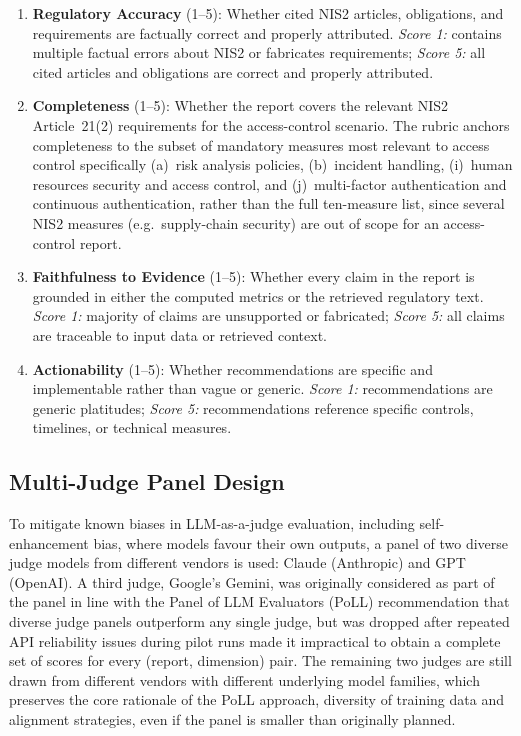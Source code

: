 \documentclass[]{UCD_CS_FYP_Report}
\begin{document}
\begin{enumerate}
    \item \textbf{Regulatory Accuracy} (1--5): Whether cited NIS2 articles, obligations, and requirements are factually correct and properly attributed. \textit{Score 1:} contains multiple factual errors about NIS2 or fabricates requirements; \textit{Score 5:} all cited articles and obligations are correct and properly attributed.
    \item \textbf{Completeness} (1--5): Whether the report covers the relevant NIS2 Article~21(2) requirements for the access-control scenario. The rubric anchors completeness to the subset of mandatory measures most relevant to access control specifically (a)~risk analysis policies, (b)~incident handling, (i)~human resources security and access control, and (j)~multi-factor authentication and continuous authentication, rather than the full ten-measure list, since several NIS2 measures (e.g.\ supply-chain security) are out of scope for an access-control report.
    \item \textbf{Faithfulness to Evidence} (1--5): Whether every claim in the report is grounded in either the computed metrics or the retrieved regulatory text. \textit{Score 1:} majority of claims are unsupported or fabricated; \textit{Score 5:} all claims are traceable to input data or retrieved context.
    \item \textbf{Actionability} (1--5): Whether recommendations are specific and implementable rather than vague or generic. \textit{Score 1:} recommendations are generic platitudes; \textit{Score 5:} recommendations reference specific controls, timelines, or technical measures.
\end{enumerate}
 
\subsection{Multi-Judge Panel Design}
 
To mitigate known biases in LLM-as-a-judge evaluation, including self-enhancement bias, where models favour their own outputs\cite{ZhengMTBench2023}, a panel of two diverse judge models from different vendors is used: Claude (Anthropic) and GPT (OpenAI). A third judge, Google's Gemini, was originally considered as part of the panel in line with the Panel of LLM Evaluators (PoLL) recommendation\cite{Verga2024PoLL} that diverse judge panels outperform any single judge, but was dropped after repeated API reliability issues during pilot runs made it impractical to obtain a complete set of scores for every (report, dimension) pair. The remaining two judges are still drawn from different vendors with different underlying model families, which preserves the core rationale of the PoLL approach, diversity of training data and alignment strategies, even if the panel is smaller than originally planned.
 
\end{document}
